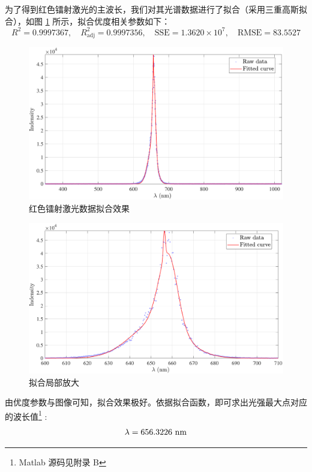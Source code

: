 \documentclass[UTF8]{article}
\theoremstyle{MyLineTheoremStyle} %
\theoremstyle{MyBlockTheoremStyle} %
\theoremstyle{MySubsubsectionStyle} %
\begin{document}
为了得到红色镭射激光的主波长，我们对其光谱数据进行了拟合（采用三重高斯拟合），如图 \ref{红色镭射激光数据拟合效果} 所示，拟合优度相关参数如下：
\begin{equation}
R^2 = 0.9997367,\quad R^2_{\text{adj}} = 0.9997356,\quad \text{SSE} = 1.3620 \times 10^7,\quad \text{RMSE} = 83.5527
\end{equation}
\begin{figure}[H]\centering
    \includegraphics[width=\columnwidth]{assets/5 光谱仪/2024-11-06_00-56-48.pdf}
    \caption{红色镭射激光数据拟合效果}\label{红色镭射激光数据拟合效果}
\end{figure}

\begin{figure}[H]\centering
    \includegraphics[width=\columnwidth]{assets/5 光谱仪/2024-11-06_01-19-00.pdf}
    \caption{拟合局部放大}\label{拟合局部放大}
\end{figure}


由优度参数与图像可知，拟合效果极好。依据拟合函数，即可求出光强最大点对应的波长值\footnote{Matlab 源码见附录 B} : 
\begin{equation}\boldmath
    \lambda = 656.3226\ \mathrm{nm}
\end{equation}
\end{document}

